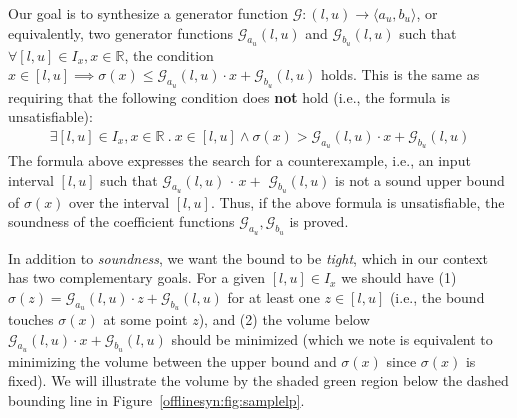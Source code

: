 Our goal is to synthesize a generator function $\mathcal{G}:
(l,u)\to \langle a_u,b_u\rangle$, or equivalently, two generator
functions $\mathcal{G}_{a_u}(l,u)$ and $\mathcal{G}_{b_u}(l,u)$ such that
%
$\forall [l, u] \in I_x, x \in \mathbb{R}$, the condition $
  x \in [l, u] \implies  \sigma(x) \leq \mathcal{G}_{a_u}(l, u) \cdot x
  +\mathcal{G}_{b_u}(l,u)
$ holds.
%
This is the same as requiring that the following condition does
\textbf{not} hold (i.e., the formula is unsatisfiable):
%
\begin{gather*}\label{offlinesyn:eq:sound}
\exists [l, u] \in I_x, x \in \mathbb{R} ~.~ x \in [l, u] \wedge \sigma(x) >
\mathcal{G}_{a_u}(l, u) \cdot x +
\mathcal{G}_{b_u}(l,u)
\end{gather*}
The formula above expresses the search for a counterexample, i.e., an input interval $
[l, u] $ such that $ \mathcal{G}_{a_u}(l, u) $  $ \cdot $  $ x + $  $
\mathcal{G}_{b_u}(l, u)
$ is not a sound upper bound of $\sigma(x) $ over the interval $ [l, u] $.
%
Thus, if the above formula is unsatisfiable, the soundness of the coefficient
functions $ \mathcal{G}_{a_u}, \mathcal{G}_{b_u} $ is proved.
%

In addition to \textit{soundness}, we want the bound to be \textit{tight},
which in our context has two complementary goals.
%
For a given $ [l, u] \in I_x $ we should have (1) $
\sigma(z) = \mathcal{G}_{a_u}(l, u) \cdot z + \mathcal{G}_{b_u}(l, u) $ for at
least one $ z \in [l, u] $ (i.e., the bound touches $ \sigma(x) $ at
some point $ z $),
%
and (2) the volume below $ \mathcal{G}_{a_u}(l, u) \cdot x +
\mathcal{G}_{b_u}(l, u) $ should be minimized (which we note is equivalent to
minimizing the volume between the upper bound and $\sigma(x)$ since $\sigma(x)$ is fixed).
%
We will illustrate the volume by the shaded green region below the dashed
bounding line in Figure~\ref{offlinesyn:fig:samplelp}.


